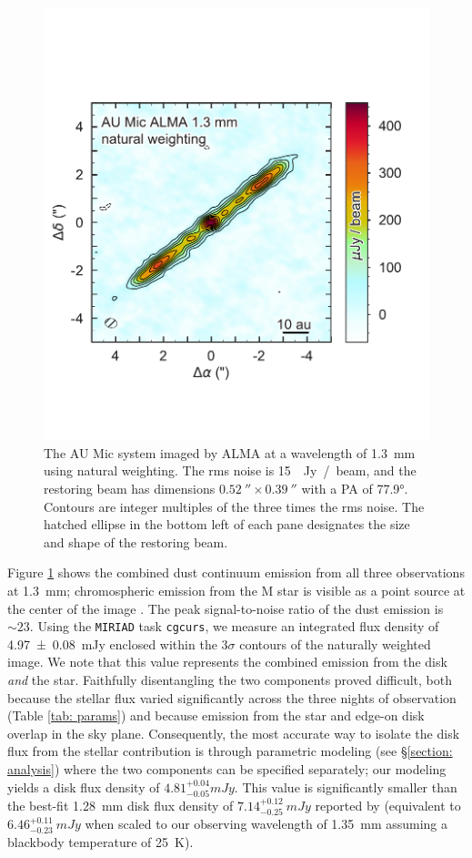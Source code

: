 \documentclass[modern]{aastex62}
\begin{document}
\begin{figure}
    \centering
    \includegraphics[width=0.8\linewidth]{../figures/aumic_imaged}
    \caption{The AU Mic system imaged by ALMA at a wavelength of \SI{1.3}{mm} using natural weighting. 
    The rms noise is \SI{15}{\mu Jy / beam}, and the restoring beam has dimensions $\SI{0.52}{\arcsecond} \times \SI{0.39}{\arcsecond}$ with a PA of \ang[angle-symbol-over-decimal]{77.9}.
    Contours are integer multiples of the three times the rms noise.
    The hatched ellipse in the bottom left of each pane designates the size and shape of the restoring beam.
    }
    \label{fig: aumic_imaged}
\end{figure}

Figure \ref{fig: aumic_imaged} shows the combined dust continuum emission from all three observations at \SI{1.3}{mm}; chromospheric emission from the M star is visible as a point source at the center of the image \citep{cranmer13}. 
The peak signal-to-noise ratio of the dust emission is $\sim 23$.
Using the \texttt{MIRIAD} task \texttt{cgcurs}, we measure an integrated flux density of \SI{4.97 \pm 0.08}{\milli Jy} enclosed within the $3\sigma$ contours of the naturally weighted image.  
We note that this value represents the combined emission from the disk \textit{and} the star. 
Faithfully disentangling the two components proved difficult, both because the stellar flux varied significantly across the three nights of observation (Table \ref{tab: params}) and because emission from the star and edge-on disk overlap in the sky plane.
Consequently, the most accurate way to isolate the disk flux from the stellar contribution is through parametric modeling (see \S \ref{section: analysis}) where the two components can be specified separately; our modeling yields a disk flux density of $4.81 ^{+0.04} _{-0.05} \si{mJy}$.
This value is significantly smaller than the best-fit \SI{1.28}{mm} disk flux density of $7.14^{+0.12}_{-0.25}~\si{mJy}$ reported by \citet{macgregor13} (equivalent to $6.46^{+0.11}_{-0.23}~\si{mJy}$ when scaled to our observing wavelength of \SI{1.35}{mm} assuming a blackbody temperature of \SI{25}{K}).
\end{document}
